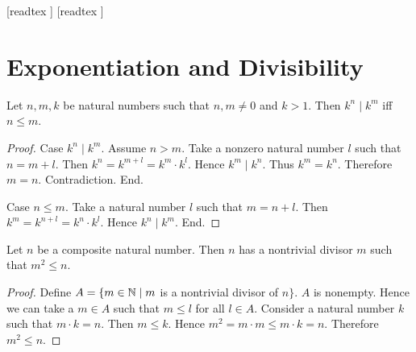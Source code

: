 \documentclass[10pt]{article}
\begin{document}
  \begin{imports}
    \begin{forthel}
      [readtex ]
      [readtex ]
    \end{forthel}
  \end{imports}


  \section*{Exponentiation and Divisibility}

  \begin{forthel}
    \begin{proposition}
      Let $n, m, k$ be natural numbers such that $n, m \neq 0$ and $k > 1$.
      Then $k^{n} \mid k^{m}$ iff $n \leq m$.
    \end{proposition}
    \begin{proof}
      Case $k^{n} \mid k^{m}$.
        Assume $n > m$.
        Take a nonzero natural number $l$ such that $n = m + l$.
        Then $k^{n}
          = k^{m + l}
          = k^{m} \cdot k^{l}$.
        Hence $k^{m} \mid k^{n}$.
        Thus $k^{m} = k^{n}$.
        Therefore $m = n$.
        Contradiction.
      End.
  
      Case $n \leq m$.
        Take a natural number $l$ such that $m = n + l$.
        Then $k^{m}
          = k^{n + l}
          = k^{n} \cdot k^{l}$.
        Hence $k^{n} \mid k^{m}$.
      End.
    \end{proof}
  \end{forthel}
  
  \begin{forthel}
    \begin{proposition}
      Let $n$ be a composite natural number.
      Then $n$ has a nontrivial divisor $m$ such that $m^{2} \leq n$.
    \end{proposition}
    \begin{proof}
      Define $A = \{ m \in \mathbb{N} \mid m$ is a nontrivial divisor of $n \}$.
      $A$ is nonempty.
      Hence we can take a $m \in A$ such that $m \leq l$ for all $l \in A$.
      Consider a natural number $k$ such that $m \cdot k = n$.
      Then $m \leq k$.
      Hence $m^{2} = m \cdot m \leq m \cdot k = n$.
      Therefore $m^{2} \leq n$.
    \end{proof}
  \end{forthel}
\end{document}
